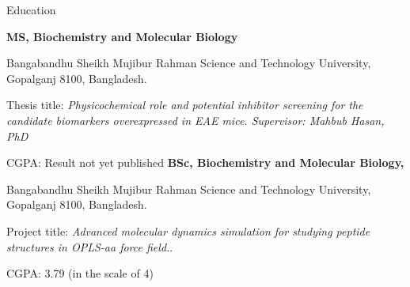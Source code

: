 \begin{rubric}{Education}

\entry*[2020 -- 2022]%
	\textbf{MS, Biochemistry and Molecular Biology}\par 
	Bangabandhu Sheikh Mujibur Rahman Science and Technology University, Gopalganj 8100, Bangladesh.\par
	Thesis title: \emph{Physicochemical role and potential inhibitor screening for the candidate biomarkers overexpressed in EAE mice. Supervisor: Mahbub Hasan, PhD}\par
	CGPA: Result not yet published
%
\entry*[2016 -- 2019]%
	\textbf{BSc, Biochemistry and Molecular Biology, }\par
	Bangabandhu Sheikh Mujibur Rahman Science and Technology University, Gopalganj 8100, Bangladesh.\par
	Project title: \emph{Advanced molecular dynamics simulation for studying peptide structures in OPLS-aa force field.}.\par
	CGPA: 3.79 (in the scale of 4)
\end{rubric}